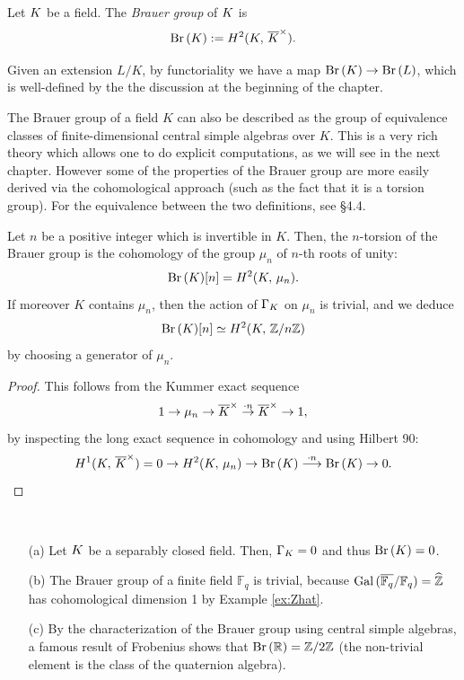 \documentclass[a4paper, oneside]{memoir}
\begin{document}
\begin{definition}
	Let $K$ be a field. The \textit{Brauer group} of $K$ is
	\[\operatorname{Br}{(K)}:=H^{2}( K, \, \overline{K}^\times ).\]
\end{definition}

\noindent Given an extension $L/K$, by functoriality we have a map $\operatorname{Br}{(K)}\to\operatorname{Br}{(L)}$, which is well-defined by the the discussion at the beginning of the chapter.

\begin{remark}\label{rm:CSA}
	The Brauer group of a field $K$ can also be described as the group of equivalence classes of finite-dimensional central simple algebras over $K$. This is a very rich theory which allows one to do explicit computations, as we will see in the next chapter. However some of the properties of the Brauer group are more easily derived via the cohomological approach (such as the fact that it is a torsion group). For the equivalence between the two definitions, see \cite{GilleSzamuely} \S 4.4.
\end{remark}

\begin{proposition}\label{prop:BrMuN}
	Let $n$ be a positive integer which is invertible in $K$. Then, the $n$-torsion of the Brauer group is the cohomology of the group $\mu_n$ of $n$-th roots of unity:
	\[
		\operatorname{Br}{(K)}[n]=H^{2}( K, \, \mu_n ).
	\]
	If moreover $K$ contains $\mu_n$, then the action of $\Gamma_K$ on $\mu_n$ is trivial, and we deduce
	\[
		\operatorname{Br}{(K)}[n]\simeq H^{2}( K, \, \mathbb{Z}/n\mathbb{Z} )
	\]
	by choosing a generator of $\mu_n$.
\end{proposition}

\begin{proof}
	This follows from the Kummer exact sequence
	\[
		1\to \mu_n\to \overline{K}^\times\overset{\cdot n}{\to} \overline{K}^\times\to 1,
	\]
	by inspecting the long exact sequence in cohomology and using Hilbert 90:
	\[
		H^{1}( K, \, \overline{K}^\times )=0\to H^{2}( K, \, \mu_n )\to \operatorname{Br}{(K)} \overset{\cdot n}{\longrightarrow}\operatorname{Br}{(K)}\to 0.
	\]
\end{proof}

\begin{example}\label{ex:Brauer}\
	\begin{itemize}
		\item[(a)] Let $K$ be a separably closed field. Then, $\Gamma_K=0$ and thus $\operatorname{Br}{(K)}=0$.
		\item[(b)] The Brauer group of a finite field $\mathbb{F}_q$ is trivial, because $\operatorname{Gal}{(\overline{\mathbb{F}_q}/\mathbb{F}_q)}=\widehat{\mathbb{Z}}$ has cohomological dimension 1 by Example \ref{ex:Zhat}.
		\item[(c)] By the characterization of the Brauer group using central simple algebras, a famous result of Frobenius shows that $\operatorname{Br}{(\mathbb{R})}=\mathbb{Z}/2\mathbb{Z}$ (the non-trivial element is the class of the quaternion algebra).
	\end{itemize}
\end{example}
\end{document}
